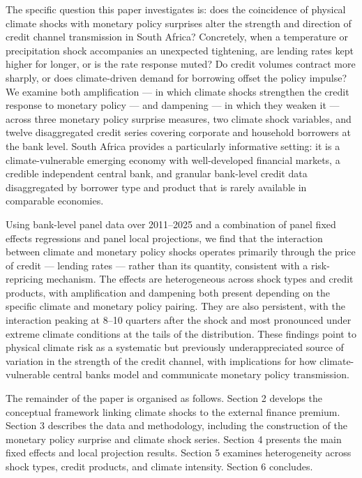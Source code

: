 \documentclass[
  letterpaper,
  DIV=11,
  numbers=noendperiod]{scrartcl}
\begin{document}
The specific question this paper investigates is: does the coincidence
of physical climate shocks with monetary policy surprises alter the
strength and direction of credit channel transmission in South Africa?
Concretely, when a temperature or precipitation shock accompanies an
unexpected tightening, are lending rates kept higher for longer, or is
the rate response muted? Do credit volumes contract more sharply, or
does climate-driven demand for borrowing offset the policy impulse? We
examine both amplification --- in which climate shocks strengthen the
credit response to monetary policy --- and dampening --- in which they
weaken it --- across three monetary policy surprise measures, two
climate shock variables, and twelve disaggregated credit series covering
corporate and household borrowers at the bank level. South Africa
provides a particularly informative setting: it is a climate-vulnerable
emerging economy with well-developed financial markets, a credible
independent central bank, and granular bank-level credit data
disaggregated by borrower type and product that is rarely available in
comparable economies.

Using bank-level panel data over 2011--2025 and a combination of panel
fixed effects regressions and panel local projections, we find that the
interaction between climate and monetary policy shocks operates
primarily through the price of credit --- lending rates --- rather than
its quantity, consistent with a risk-repricing mechanism. The effects
are heterogeneous across shock types and credit products, with
amplification and dampening both present depending on the specific
climate and monetary policy pairing. They are also persistent, with the
interaction peaking at 8--10 quarters after the shock and most
pronounced under extreme climate conditions at the tails of the
distribution. These findings point to physical climate risk as a
systematic but previously underappreciated source of variation in the
strength of the credit channel, with implications for how
climate-vulnerable central banks model and communicate monetary policy
transmission.

The remainder of the paper is organised as follows. Section 2 develops
the conceptual framework linking climate shocks to the external finance
premium. Section 3 describes the data and methodology, including the
construction of the monetary policy surprise and climate shock series.
Section 4 presents the main fixed effects and local projection results.
Section 5 examines heterogeneity across shock types, credit products,
and climate intensity. Section 6 concludes.
\end{document}
